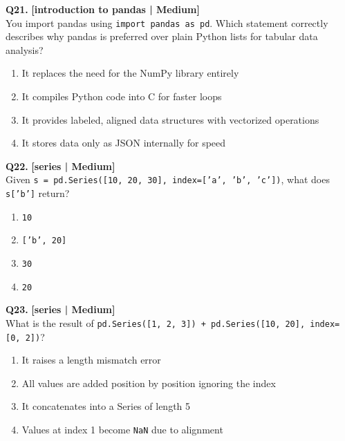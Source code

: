\noindent\textbf{Q21.} \hfill {\small\color{LPUOrange}\textbf{[introduction to pandas | Medium]}}\\[2pt]
You import pandas using \texttt{import pandas as pd}. Which statement correctly describes why pandas is preferred over plain Python lists for tabular data analysis?

\begin{enumerate}[label=(\alph*),topsep=2pt,itemsep=1pt,partopsep=0pt,parsep=0pt]
    \item \relax It replaces the need for the NumPy library entirely
    \item \relax It compiles Python code into C for faster loops
    \item \relax It provides labeled, aligned data structures with vectorized operations
    \item \relax It stores data only as JSON internally for speed
\end{enumerate}
\vspace{2mm}

\noindent\textbf{Q22.} \hfill {\small\color{LPUOrange}\textbf{[series | Medium]}}\\[2pt]
Given \texttt{s = pd.Series([10, 20, 30], index=['a', 'b', 'c'])}, what does \texttt{s['b']} return?

\begin{enumerate}[label=(\alph*),topsep=2pt,itemsep=1pt,partopsep=0pt,parsep=0pt]
    \item \relax \texttt{10}
    \item \relax \texttt{['b', 20]}
    \item \relax \texttt{30}
    \item \relax \texttt{20}
\end{enumerate}
\vspace{2mm}

\noindent\textbf{Q23.} \hfill {\small\color{LPUOrange}\textbf{[series | Medium]}}\\[2pt]
What is the result of \texttt{pd.Series([1, 2, 3]) + pd.Series([10, 20], index=[0, 2])}?

\begin{enumerate}[label=(\alph*),topsep=2pt,itemsep=1pt,partopsep=0pt,parsep=0pt]
    \item \relax It raises a length mismatch error
    \item \relax All values are added position by position ignoring the index
    \item \relax It concatenates into a Series of length 5
    \item \relax Values at index 1 become \texttt{NaN} due to alignment
\end{enumerate}
\vspace{2mm}

